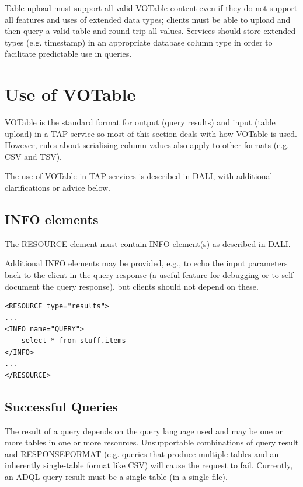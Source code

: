 \documentclass[11pt,letter]{ivoa}
\begin{document}
Table upload must support all valid VOTable content even if they do not support 
all features and uses of extended data types; clients must be able to upload and then
query a valid table and round-trip all values. Services should store extended types (e.g. 
timestamp) in an appropriate database column type in order to facilitate predictable use 
in queries.

\section{Use of VOTable}
\label{sec:votable}

VOTable \citep{2013ivoa.spec.0920O} is the standard format for output (query 
results) and input (table upload) in a TAP service so most of this section 
deals with how VOTable is used. However, rules about serialising column values 
also apply to other formats (e.g. CSV and TSV).

The use of VOTable in TAP services is described in DALI, with additional clarifications
or advice below.

\subsection{INFO elements}
\label{sec:vot-info}

The RESOURCE element must contain INFO element(s) as described in DALI.

Additional INFO elements may be provided, e.g., to echo the input parameters 
back to the client in the query response (a useful feature for debugging or to 
self-document the query response), but clients should not depend on these. 

\begin{verbatim}
<RESOURCE type="results">
...
<INFO name="QUERY">
    select * from stuff.items
</INFO>
...
</RESOURCE>
\end{verbatim}

\subsection{Successful Queries}
\label{sec:query-ok}

The result of a query depends on the query language used and may be one or more 
tables in one or more resources. Unsupportable combinations of query result and 
RESPONSEFORMAT (e.g. queries that produce multiple tables and an inherently 
single-table format like CSV) will cause the request to fail. Currently, an ADQL 
query result must be a single table (in a single file).
\end{document}
